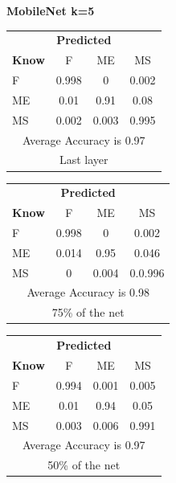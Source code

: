 \documentclass[12pt]{article} %
\begin{document}
\begin{center}
\textbf{MobileNet k=5}
\end{center}
\begin{minipage}{0.5\textwidth}
\begin{center}
\begin{tabular}{l|c|c|c|}
 \multicolumn{4}{c}{ \textbf{ Predicted}}\\
 \textbf{Know}&F&ME&MS\\ \hline\hline
F   &0.998&0&0.002\\
ME &0.01&0.91&0.08\\
MS &0.002&0.003&0.995\\
\multicolumn{4}{c}{Average Accuracy is 0.97}\\
\multicolumn{4}{c}{Last layer}\\
\end{tabular}
\end{center}
\end{minipage}
\begin{minipage}{0.5\textwidth}
\begin{center}
\begin{tabular}{l|c|c|c|}
 \multicolumn{4}{c}{ \textbf{ Predicted}}\\
 \textbf{Know}&F&ME&MS\\ \hline\hline
F   &0.998&0&0.002\\
ME &0.014&0.95&0.046\\
MS &0&0.004&0.0.996\\
\multicolumn{4}{c}{Average Accuracy is 0.98}\\
\multicolumn{4}{c}{75\%  of the net}\\
\end{tabular}
\end{center}
\end{minipage}
\begin{minipage}{0.5\textwidth}
\begin{center}
\begin{tabular}{l|c|c|c|}
 \multicolumn{4}{c}{ \textbf{ Predicted}}\\
 \textbf{Know}&F&ME&MS\\ \hline\hline
F   &0.994&0.001&0.005\\
ME &0.01&0.94&0.05\\
MS &0.003&0.006&0.991\\
\multicolumn{4}{c}{Average Accuracy is 0.97}\\
\multicolumn{4}{c}{50\%  of the net}\\
\end{tabular}
\end{center}
\end{minipage}
\end{document}
